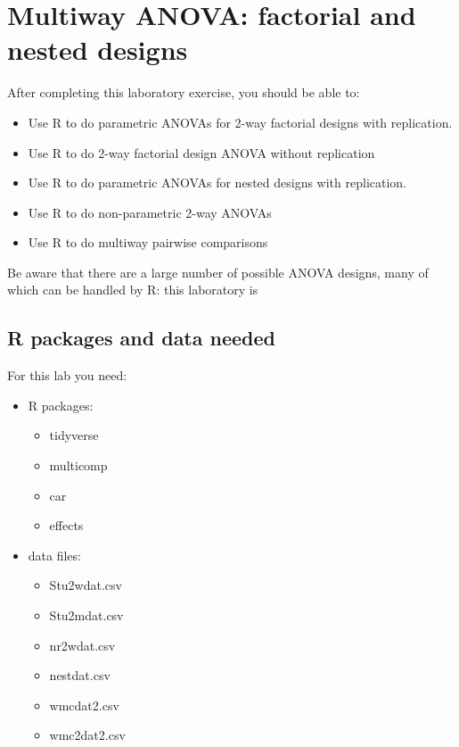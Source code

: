 \documentclass[
  12pt,
]{book}
\providecommand{\tightlist}{%
  \setlength{\itemsep}{0pt}\setlength{\parskip}{0pt}}
\begin{document}
\hypertarget{multiway-anova-factorial-and-nested-designs}{%
\chapter{Multiway ANOVA: factorial and nested designs}\label{multiway-anova-factorial-and-nested-designs}}

After completing this laboratory exercise, you should be able to:

\begin{itemize}
\tightlist
\item
  Use R to do parametric ANOVAs for 2-way factorial designs with replication.
\item
  Use R to do 2-way factorial design ANOVA without replication
\item
  Use R to do parametric ANOVAs for nested designs with replication.
\item
  Use R to do non-parametric 2-way ANOVAs
\item
  Use R to do multiway pairwise comparisons
\end{itemize}

Be aware that there are a large number of possible ANOVA designs,
many of which can be handled by R: this laboratory is

\hypertarget{set-anomul}{%
\section{R packages and data needed}\label{set-anomul}}

For this lab you need:

\begin{itemize}
\tightlist
\item
  R packages:

  \begin{itemize}
  \tightlist
  \item
    tidyverse
  \item
    multicomp
  \item
    car
  \item
    effects
  \end{itemize}
\item
  data files:

  \begin{itemize}
  \tightlist
  \item
    Stu2wdat.csv
  \item
    Stu2mdat.csv
  \item
    nr2wdat.csv
  \item
    nestdat.csv
  \item
    wmcdat2.csv
  \item
    wmc2dat2.csv
  \end{itemize}
\end{itemize}
\end{document}
